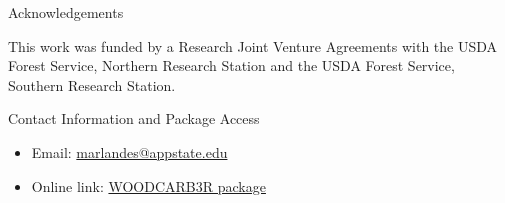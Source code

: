 \documentclass[final]{beamer}\usepackage[]{graphicx}\usepackage[]{color}
\newlength{\onecolwid}
\begin{document}
\begin{frame}[t]
\begin{columns}[t]
\begin{column}{\onecolwid}


\begin{block}{Acknowledgements}

This work was funded by a Research Joint Venture Agreements with the USDA Forest Service, Northern Research Station and the USDA Forest Service, Southern Research Station.

\end{block}



\begin{alertblock}{Contact Information and Package Access}

\begin{itemize}
\item Email: \href{marlandes@appstate.edu}{marlandes@appstate.edu}
\item Online link: \href{http://benjones2.github.io/WOODCARB3R/}{WOODCARB3R package}
\end{itemize}
\vspace{0ex}
\begin{center}
\end{center}


\end{alertblock}
\end{column}
\end{columns}
\end{frame}
\end{document}
